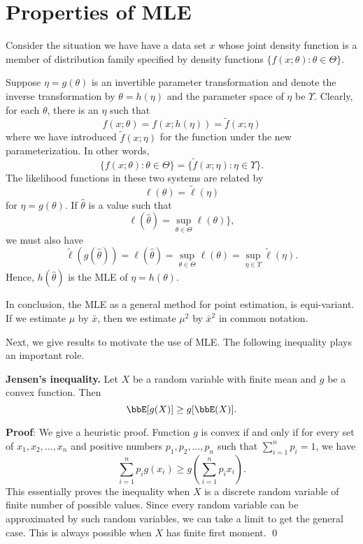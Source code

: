 \chapter{Properties of MLE}

Consider the situation we have have a data set $x$ whose
joint density function is a member of distribution family
specified by density functions $\{f(x; \theta): \theta \in \Theta\}$.

Suppose $\eta = g(\theta)$ is an invertible parameter transformation
and denote the inverse transformation by $\theta = h(\eta)$ and the
parameter space of $\eta$ be $\Upsilon$. Clearly,
for each $\theta$, there is an $\eta$ such that
\[
f(x; \theta) = f(x; h(\eta)) = \tilde f(x; \eta)
\]
where we have introduced $\tilde f(x; \eta)$ for the function
under the new parameterization.
In other words,
\[
\{f(x; \theta): \theta \in \Theta\} = \{ \tilde f (x; \eta): \eta \in \Upsilon\}.
\]
The likelihood functions in these two systems are related by
\[
\ell(\theta) = \tilde \ell( \eta)
\]
for $\eta = g(\theta)$.
If $\hat \theta$ is a value such that
\[
\ell(\hat \theta) = \sup_{\theta \in \Theta} \ell(\theta)\},
\]
we must also have 
\[
\tilde \ell(g(\hat \theta)) =  \ell(\hat \theta) 
= \sup_{\theta \in \Theta} \ell(\theta)
= \sup_{\eta \in \Upsilon} \tilde \ell(\eta).
\]
Hence, $h(\hat \theta)$ is the MLE of $\eta = h(\theta)$.

In conclusion, the MLE as a general method for point estimation,
is equi-variant. If we estimate $\mu$ by $\bar x$, then we
estimate $\mu^2$ by $\bar x^2$ in common notation.

Next, we give results to motivate the use of MLE.
The following inequality plays an important role.

\vs\no
{\bf Jensen's inequality.}
Let $X$ be a random variable with finite mean and $g$ be a convex function.
Then
\[
\bbE[ g(X)] \geq g[\bbE(X)].
\]

\no
\noindent
{\bf Proof}: We give a heuristic proof.
Function $g$ is convex if and only if for every set of
$x_1, x_2, \ldots, x_n$ and positive numbers
$p_1, p_2, \ldots, p_n$ such that $\sum_{i=1}^n p_i = 1$,
we have
\[
\sum_{i=1}^n p_i g(x_i) \geq g ( \sum_{i=1}^n p_i x_i).
\]
This essentially proves the inequality when $X$ is a discrete
random variable of finite number of possible values.
Since every random variable can be approximated by such
random variables, we can take a limit to get the general
case. This is always possible when $X$ has finite first moment.
\qed

